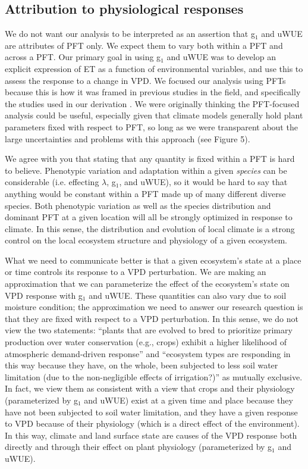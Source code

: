 \documentclass[12pt]{article}
\begin{document}
\subsection{Attribution to physiological responses}

We do not want our analysis to be interpreted as an assertion that
g$_1$ and uWUE are attributes of PFT only. We expect them to vary both
within a PFT and across a PFT. Our primary goal in using g$_1$ and
uWUE was to develop an explicit expression of ET as a function of
environmental variables, and use this to assess the response to a
change in VPD. We focused our analysis using PFTs because this is how
it was framed in previous studies in the field, and specifically the
studies used in our derivation \cite{Zhou_2014, Zhou_2015,
  Medlyn_2017}. We were originally thinking the PFT-focused analysis
could be useful, especially given that climate models generally hold
plant parameters fixed with respect to PFT, so long as we were
transparent about the large uncertainties and problems with this
approach (see Figure 5).

We agree with you that stating that any quantity is fixed within a PFT
is hard to believe. Phenotypic variation and adaptation within a given
\textit{species} can be considerable (i.e. effecting $\lambda$, g$_1$, and
uWUE), so it would be hard to say that anything would be constant
within a PFT made up of many different diverse species. Both
phenotypic variation as well as the species distribution and dominant
PFT at a given location will all be strongly optimized in response to
climate. In this sense, the distribution and evolution of local
climate is a strong control on the local ecosystem structure and
physiology of a given ecosystem.

What we need to communicate better is that a given ecosystem's state
at a place or time controls its response to a VPD perturbation. We are
making an approximation that we can parameterize the effect of the
ecosystem's state on VPD response with g$_1$ and uWUE. These quantities
can also vary due to soil moisture condition; the approximation we
need to answer our research question is that they are fixed
with respect to a VPD perturbation. In this sense, we do not view the
two statements: ``plants that are evolved to bred to prioritize
primary production over water conservation (e.g., crops) exhibit a
higher likelihood of atmospheric demand-driven response'' and
``ecosystem types are responding in this way because they have, on the
whole, been subjected to less soil water limitation (due to the
non-negligible effects of irrigation?)'' as mutually exclusive. In
fact, we view them as consistent with a view that crops and their
physiology (parameterized by g$_1$ and uWUE) exist at a given time and
place because they have not been subjected to soil water limitation,
and they have a given response to VPD because of their physiology
(which is a direct effect of the environment). In this way, climate
and land surface state are causes of the VPD response both directly
and through their effect on plant physiology (parameterized by g$_1$
and uWUE).
\end{document}
